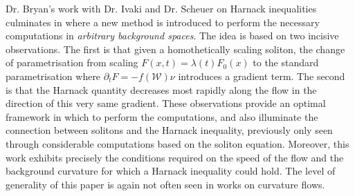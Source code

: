 \documentclass[12pt]{article}
\begin{document}
Dr. Bryan's work with Dr. Ivaki and Dr. Scheuer on Harnack inequalities culminates in \cite{BIS4} where a new method is introduced to perform the necessary computations in \emph{arbitrary background spaces}. The idea is based on two incisive observations. The first is that given a homothetically scaling soliton, the change of parametrisation from scaling \(F(x, t) = \lambda(t) F_0(x)\) to the standard parametrisation where \(\partial_t F = -f(\mathcal{W})\nu\) introduces a gradient term. The second is that the Harnack quantity decreases most rapidly along the flow in the direction of this very same gradient. These observations provide an optimal framework in which to perform the computations, and also illuminate the connection between solitons and the Harnack inequality, previously only seen through considerable computations based on the soliton equation. Moreover, this work exhibits precisely the conditions required on the speed of the flow and the background curvature for which a Harnack inequality could hold. The level of generality of this paper is again not often seen in works on curvature flows.
\end{document}
